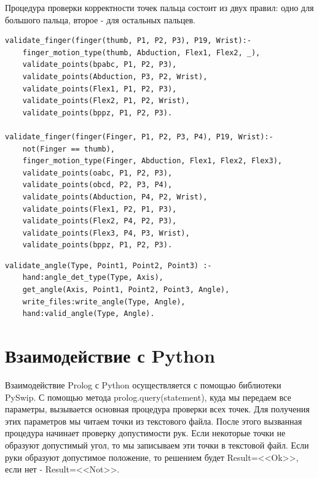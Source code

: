 Процедура проверки корректности точек пальца состоит из двух правил: одно для большого пальца, второе - для остальных пальцев.
\begin{lstlisting}[caption=Процедура проверки корректности точек пальца, label=list:validate_finger]
validate_finger(finger(thumb, P1, P2, P3), P19, Wrist):-
	finger_motion_type(thumb, Abduction, Flex1, Flex2, _),
	validate_points(bpabc, P1, P2, P3),
	validate_points(Abduction, P3, P2, Wrist),
	validate_points(Flex1, P1, P2, P3),
	validate_points(Flex2, P1, P2, Wrist),
	validate_points(bppz, P1, P2, P3).
	
validate_finger(finger(Finger, P1, P2, P3, P4), P19, Wrist):-
	not(Finger == thumb),
	finger_motion_type(Finger, Abduction, Flex1, Flex2, Flex3),
	validate_points(oabc, P1, P2, P3),
	validate_points(obcd, P2, P3, P4),
	validate_points(Abduction, P4, P2, Wrist),
	validate_points(Flex1, P2, P1, P3),
	validate_points(Flex2, P4, P2, P3),
	validate_points(Flex3, P4, P3, Wrist),
	validate_points(bppz, P1, P2, P3).
\end{lstlisting}

\begin{lstlisting}[caption=Процедура проверки угла между точками на корректность, label=list:validate_angle]
validate_angle(Type, Point1, Point2, Point3) :-
	hand:angle_det_type(Type, Axis),
	get_angle(Axis, Point1, Point2, Point3, Angle),
	write_files:write_angle(Type, Angle),
	hand:valid_angle(Type, Angle).
\end{lstlisting}

\section{Взаимодействие с Python}
\hspace{0.6cm}Взаимодействие Prolog с Python осуществляется с помощью библиотеки PySwip. С помощью метода prolog.query(statement), куда мы передаем все параметры, вызывается основная процедура проверки всех точек. Для получения этих параметров мы читаем точки из текстового файла. После этого вызванная процедура начинает проверку допустимости рук. Если некоторые точки не образуют допустимый угол, то мы записываем эти точки в текстовой файл. Если руки образуют допустимое положение, то решением будет Result=<<Ok>>, если нет - Result=<<Not>>.

